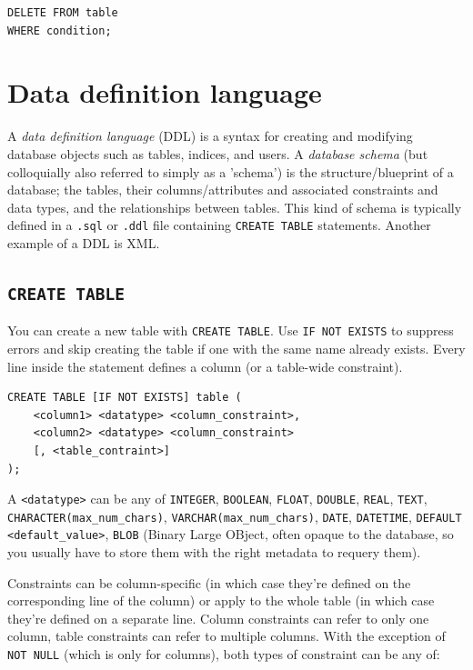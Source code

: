 \documentclass[table, xcdraw]{article}%
\begin{document}
\begin{verbatim}
DELETE FROM table
WHERE condition;
\end{verbatim}

\section{Data definition language}

A \emph{data definition language} (DDL) is a syntax for creating and modifying database objects such as tables, indices, and users. A \emph{database schema} (but colloquially also referred to simply as a 'schema') is the structure/blueprint of a database; the tables, their columns/attributes and associated constraints and data types, and the relationships between tables. This kind of schema is typically defined in a \texttt{.sql} or \texttt{.ddl} file containing \texttt{CREATE TABLE} statements. Another example of a DDL is XML.

\subsection{\texttt{CREATE TABLE}}

You can create a new table with \texttt{CREATE TABLE}. Use \texttt{IF NOT EXISTS} to suppress errors and skip creating the table if one with the same name already exists. Every line inside the statement defines a column (or a table-wide constraint).

\begin{verbatim}
CREATE TABLE [IF NOT EXISTS] table (
    <column1> <datatype> <column_constraint>,
    <column2> <datatype> <column_constraint>
    [, <table_contraint>]
);
\end{verbatim}

A \texttt{<datatype>} can be any of \texttt{INTEGER}, \texttt{BOOLEAN}, \texttt{FLOAT}, \texttt{DOUBLE}, \texttt{REAL}, \texttt{TEXT}, \texttt{CHARACTER(max_num_chars)}, \texttt{VARCHAR(max_num_chars)}, \texttt{DATE}, \texttt{DATETIME}, \texttt{DEFAULT <default_value>}, \texttt{BLOB} (Binary Large OBject, often opaque to the database, so you usually have to store them with the right metadata to requery them).

Constraints can be column-specific (in which case they're defined on the corresponding line of the column) or apply to the whole table (in which case they're defined on a separate line. Column constraints can refer to only one column, table constraints can refer to multiple columns. With the exception of \texttt{NOT NULL} (which is only for columns), both types of constraint can be any of:
\end{document}
